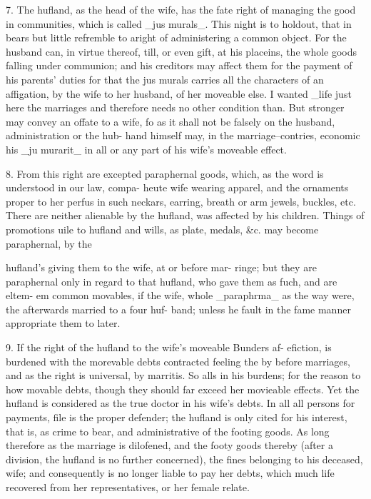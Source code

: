 \documentclass{article}
\begin{document}
7. The hufland, as the head of the wife, has the fate right of managing the good in communities, which is called \_jus murals\_. This night is to holdout, that in bears but little refremble to aright of administering a common object. For the husband can, in virtue thereof, till, or even gift, at his placeins, the whole goods falling under communion; and his creditors may affect them for the payment of his parents’ duties for that the jus murals carries all the characters of an affigation, by the wife to her husband, of her moveable else. I wanted \_life just here the marriages and therefore needs no other condition than. But stronger may convey an offate to a wife, fo as it shall not be falsely on the husband, administration or the hub- hand himself may, in the marriage–contries, economic his \_ju murarit\_ in all or any part of his wife’s moveable effect.

8. From this right are excepted paraphernal goods, which, as the word is understood in our law, compa- heute wife wearing apparel, and the ornaments proper to her perfus in such neckars, earring, breath or arm jewels, buckles, etc. There are neither alienable by the hufland, was affected by his children. Things of promotions uile to hufland and wills, as plate, medals, \&c. may become paraphernal, by the

hufland's giving them to the wife, at or before mar- ringe; but they are paraphernal only in regard to that hufland, who gave them as fuch, and are eltem- em common movables, if the wife, whole \_paraphrma\_ as the way were, the afterwards married to a four huf- band; unless he fault in the fame manner appropriate them to later.

9. If the right of the hufland to the wife’s moveable Bunders af- efiction, is burdened with the morevable debts contracted feeling the by before marriages, and as the right is universal, by marritis. So alls in his burdens; for the reason to how movable debts, though they should far exceed her movieable effects. Yet the hufland is considered as the true doctor in his wife’s debts. In all all persons for payments, file is the proper defender; the hufland is only cited for his interest, that is, as crime to bear, and administrative of the footing goods. As long therefore as the marriage is dilofened, and the footy goods thereby (after a division, the hufland is no further concerned), the fines belonging to his deceased, wife; and consequently is no longer liable to pay her debts, which much life recovered from her representatives, or her female relate.
\end{document}
